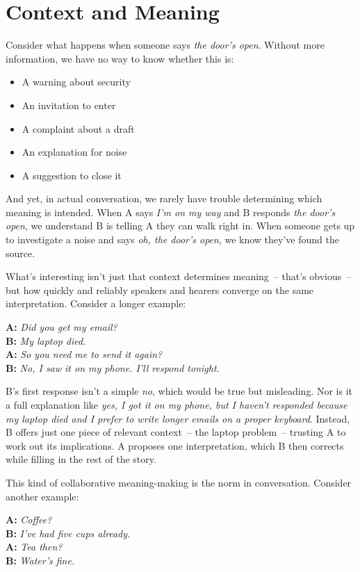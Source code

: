 \section{Context and Meaning}

Consider what happens when someone says \textit{the door's open}. Without more information, we have no way to know whether this is:

\begin{itemize}
    \item A warning about security
    \item An invitation to enter
    \item A complaint about a draft 
    \item An explanation for noise
    \item A suggestion to close it
\end{itemize}

And yet, in actual conversation, we rarely have trouble determining which meaning is intended. When A says \textit{I'm on my way} and B responds \textit{the door's open}, we understand B is telling A they can walk right in. When someone gets up to investigate a noise and says \textit{oh, the door's open}, we know they've found the source. 

What's interesting isn't just that context determines meaning~-- that's obvious~-- but how quickly and reliably speakers and hearers converge on the same interpretation. Consider a longer example:

\ea
   \textbf{A:} \textit{Did you get my email?}\\
   \textbf{B:} \textit{My laptop died.}\\
   \textbf{A:} \textit{So you need me to send it again?}\\
   \textbf{B:} \textit{No, I saw it on my phone. I'll respond tonight.}
\z

B's first response isn't a simple \textit{no}, which would be true but misleading. Nor is it a full explanation like \textit{yes, I got it on my phone, but I haven't responded because my laptop died and I prefer to write longer emails on a proper keyboard}. Instead, B offers just one piece of relevant context~-- the laptop problem~-- trusting A to work out its implications. A proposes one interpretation, which B then corrects while filling in the rest of the story.

This kind of collaborative meaning-making is the norm in conversation. Consider another example:

\ea
   \textbf{A:} \textit{Coffee?}\\
   \textbf{B:} \textit{I've had five cups already.}\\
   \textbf{A:} \textit{Tea then?}\\
   \textbf{B:} \textit{Water's fine.}
\z

